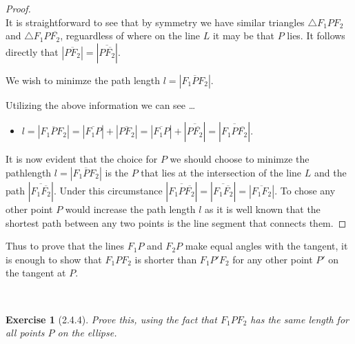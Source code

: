 \documentclass[12pt]{article}
\newcommand{\XB}{\color{black}}
\newcommand{\XBB}{\color{blue}}
\newcommand{\ds}{\displaystyle}
\theoremstyle{plain}
\newtheorem{ex}{Exercise}
\begin{document}
\begin{proof}
  \ \\

  It is straightforward to see that by symmetry we have similar triangles $ \triangle F_{1}PF_{2} $ and $ \triangle F_{1}P\overline{F_2} $, reguardless of where on the line $ L $ it may be that $ P $ lies.
  It follows directly that $ \ds | \overline{PF_{2}} | = | \overline{P\overline{F_2}} | $.

  We wish to minimze the path length $ l = | \overline{F_{1}PF_{2}} | $. 

  Utilizing the above information we can see \dots 

  \begin{itemize}
    \item $ l = | \overline{F_{1}PF_{2}} | = | \overline{F_{1}P} | + | \overline{PF_{2}} | = | \overline{F_{1}P} | + | \overline{P\overline{F_2}} | = | \overline{F_{1}P\overline{F_2}} | $. 
  \end{itemize}

  It is now evident that the choice for $ P $ we should choose to minimze the pathlength $ l = | \overline{F_{1}PF_{2}} | $ is the $ P $ that lies at the intersection of the line $ L $ and the path $ | \overline{F_{1}\overline{F_2}} | $.
  Under this circumstance $ | \overline{F_{1}P\overline{F_2}} | = | \overline{F_{1}\overline{F_2}} | = | \overline{F_{1}F_2} | $. 
  To chose any other point $ P $ would increase the path length $ l $ as it is well known that the shortest path between any two points is the line segment that connects them.

\end{proof}

\vfill

Thus to prove that the lines $F_1P$ and $F_2P$ make equal angles with the tangent, it is enough to show that $F_1PF_2$ is shorter than $F_1P'F_2$ for any other point $P'$ on the tangent at $P$.

\newpage
\XBB\hrulefill\XB \\
\begin{ex} [2.4.4]
  Prove this, using the fact that $F_1PF_2$ has the same length for all points $P$ on the ellipse.
\end{ex}
\XBB\hrulefill\XB \\
\end{document}
